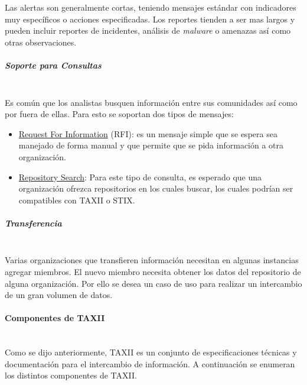 Las alertas son generalmente cortas, teniendo mensajes estándar con indicadores 
muy específicos o acciones especificadas. Los reportes tienden a ser mas largos 
y pueden incluir reportes de incidentes, análisis de \textit{malware} o amenazas así como 
otras observaciones.

\subparagraph{Soporte para Consultas}\ \\

Es común que los analistas busquen información entre sus comunidades así como 
por fuera de ellas. Para esto se soportan dos tipos de mensajes:
\begin{itemize}
  \item \underline{Request For Information} (RFI): es un mensaje simple que se espera sea 
  manejado de forma manual y que permite que se pida información a otra 
  organización.
  \item \underline{Repository Search}: Para este tipo de consulta, es esperado que una 
  organización ofrezca repositorios en los cuales buscar, los cuales podrían ser 
  compatibles con TAXII o STIX.
\end{itemize}

\subparagraph{Transferencia}\ \\

Varias organizaciones que transfieren información necesitan en algunas 
instancias agregar miembros. El nuevo miembro necesita obtener los datos del 
repositorio de alguna organización. Por ello se desea un caso de uso para 
realizar un intercambio de un gran volumen de datos.

\paragraph{Componentes de TAXII}\ \\

Como se dijo anteriormente, TAXII es un conjunto de especificaciones técnicas y 
documentación para el intercambio de información. A continuación se enumeran los 
distintos componentes de TAXII.

